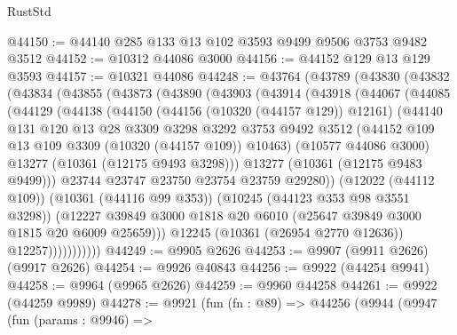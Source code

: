 \begin{lexlean}{RustStd}
\begin{coremodule}
@44150 := @44140 @285 @133 @13 @102 @3593 @9499 @9506 @3753 @9482 @3512
@44152 := @10312 @44086 @3000
@44156 := @44152 @129 @13 @129 @3593
@44157 := @10321 @44086
@44248 := @43764
    (@43789
      (@43830
        (@43832
          (@43834
            (@43855
              (@43873
                (@43890
                  (@43903
                    (@43914
                      (@43918
                        (@44067
                          (@44085
                            (@44129
                              (@44138
                                (@44150
                                  (@44156 (@10320 (@44157 @129)) @12161)
                                  (@44140
                                    @131
                                    @120
                                    @13
                                    @28
                                    @3309
                                    @3298
                                    @3292
                                    @3753
                                    @9492
                                    @3512
                                    (@44152 @109 @13 @109 @3309 (@10320 (@44157 @109)) @10463)
                                    (@10577 @44086 @3000)
                                    @13277
                                    (@10361 (@12175 @9493 @3298)))
                                  @13277
                                  (@10361 (@12175 @9483 @9499)))
                                @23744
                                @23747
                                @23750
                                @23754
                                @23759
                                @29280))
                            (@12022 (@44112 @109))
                            (@10361 (@44116 @99 @353))
                            (@10245 (@44123 @353 @98 @3551 @3298))
                            (@12227
                              @39849
                              @3000
                              @1818
                              @20
                              @6010
                              (@25647 @39849 @3000 @1815 @20 @6009 @25659)))
                          @12245
                          (@10361 (@26954 @2770 @12636))
                          @12257)))))))))))
@44249 := @9905 @2626
@44253 := @9907 (@9911 @2626) (@9917 @2626)
@44254 := @9926 @40843
@44256 := @9922 (@44254 @9941)
@44258 := @9964 (@9965 @2626)
@44259 := @9960 @44258
@44261 := @9922 (@44259 @9989)
@44278 := @9921
    (fun (fn : @89) =>
    @44256
      (@9944
        (@9947
          (fun (params : @9946) =>

\end{coremodule}
\end{lexlean}
